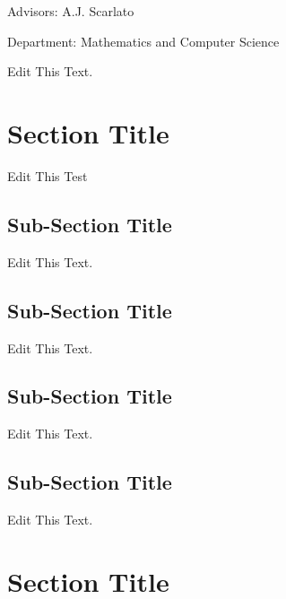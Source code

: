 \documentclass[12pt]{article}
\newcommand{\myAdvisorOne}{A.J. Scarlato}
\newcommand{\myDepartment}{Mathematics and Computer Science}
\begin{document}
\vspace{0.5in}

Advisors: \myAdvisorOne

Department: \myDepartment
\singlespacing

\vspace{0.5in}

\doublespacing

Edit This Text.

\newpage
\section{Section Title}
Edit This Test

\subsection{Sub-Section Title}

Edit This Text.

\subsection{Sub-Section Title}

Edit This Text.

\subsection{Sub-Section Title}

Edit This Text.

\subsection{Sub-Section Title}

Edit This Text.

\section{Section Title}
\end{document}

